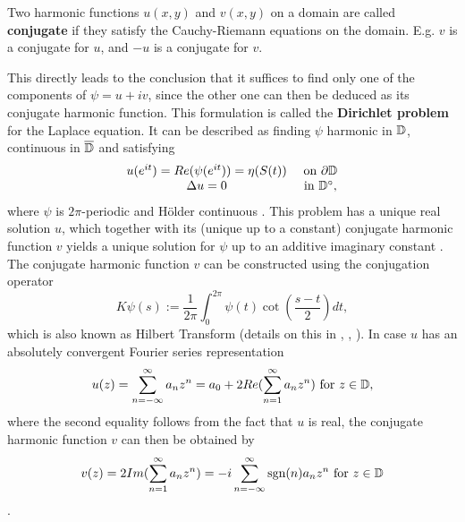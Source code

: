 \begin{definition} 
    Two harmonic functions $u(x,y)$ and $v(x,y)$ on a domain are called \textbf{conjugate} if they satisfy the Cauchy-Riemann equations on the domain. E.g. $v$ is a conjugate for $u$, and $-u$ is a conjugate for $v$.
\end{definition}

This directly leads to the conclusion that it suffices to find only one of the components of $\psi=u+iv$, since the other one can then be deduced as its conjugate harmonic function.
This formulation is called the \textbf {Dirichlet problem} for the Laplace equation.
It can be described as finding $\psi$ harmonic in $\mathbb{D}$, continuous in $\overline{\mathbb{D}}$ and satisfying 
\begin{equation} \label{eq:DirichletProblem}
    \begin{matrix}
        u(e^{it})=Re(\psi(e^{it}))=\eta(S(t)) &\text{ on }\partial\mathbb{D} \\
        \Delta u = 0 &\text{ in } \mathbb{D}^{\circ},
    \end{matrix}
\end{equation}
where $\psi$ is $2\pi$-periodic and Hölder continuous \cite[Chapter 12.3]{Wegmann2005_num_methods_confmapping}.
This problem has a unique real solution $u$, which together with its (unique up to a constant) conjugate harmonic function $v$ yields a unique solution for $\psi$ up to an additive imaginary constant \cite[Corollary 15.1b]{Henrici1986_vol3}. 
The conjugate harmonic function $v$ can be constructed using the conjugation operator 
\begin{equation}\label{eq:operatorK}
    K\psi(s) := \frac{1}{2\pi}\int_{0}^{2\pi} \psi(t)\cot(\frac{s-t}{2}) dt,
\end{equation}
which is also known as Hilbert Transform (details on this in \cite[Chapter 2.5]{Wegmann2005_num_methods_confmapping}, \cite{Castillo2025_hilberttransform}, \cite[Theorem 14.2c]{Henrici1986_vol3}).
In case $u$ has an absolutely convergent Fourier series representation
\begin{equation}
    u(z)=\sum_{n=-\infty}^{\infty} a_n z^n = a_0 + 2 Re(\sum_{n=1}^{\infty} a_n z^n) \text{ for } z\in\mathbb{D},
\end{equation}
where the second equality follows from the fact that $u$ is real, the conjugate harmonic function $v$ can then be obtained by
\begin{equation}
    v(z) = 2 Im(\sum_{n=1}^{\infty} a_n z^n) = -i \sum_{n=-\infty}^{\infty} \text{sgn}(n)a_n z^n  \text{ for } z\in\mathbb{D}
\end{equation}
\cite[Theorem 13.5a]{Henrici1986_vol3}.

